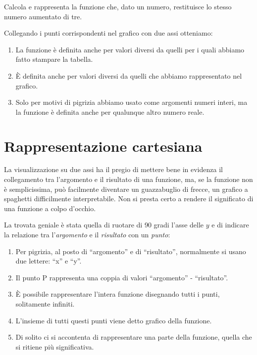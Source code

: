 \begin{esempio}
Calcola e rappresenta la funzione che, dato un numero, restituisce lo 
stesso numero aumentato di tre.


Collegando i punti corrispondenti nel grafico con due assi otteniamo:

\end{esempio}


\begin{osservazione}
\begin{enumerate}
\item La funzione è definita anche per valori diversi da quelli per i quali 
abbiamo fatto stampare la tabella.
\item È definita anche per valori diversi da quelli che abbiamo 
rappresentato nel grafico.
\item Solo per motivi di pigrizia abbiamo usato come argomenti numeri 
interi, ma la funzione è definita anche per qualunque altro numero reale.
\end{enumerate}
\end{osservazione}

\section{Rappresentazione cartesiana}
\label{sec:funzioni2_rcartesiana}

La visualizzazione su due assi ha il pregio di mettere bene in evidenza il 
collegamento tra l'argomento e il risultato di una funzione, ma, se la 
funzione non è semplicissima, può facilmente diventare un guazzabuglio di 
frecce, un grafico a spaghetti difficilmente interpretabile. Non si presta 
certo a rendere il significato di una funzione a colpo d'occhio.

La trovata geniale è stata quella di ruotare di 90 gradi l'asse delle $y$ e 
di indicare la relazione tra l'\emph{argomento} e il \emph{risultato} con 
un \emph{punto}:


\begin{osservazione}
\begin{enumerate} [nosep]
\item Per pigrizia, al posto di  ``argomento'' e di  ``risultato'', 
normalmente si usano due lettere:  ``x'' e  ``y''.
\item Il punto P rappresenta una coppia di valori  ``argomento'' -  
``risultato''.
\item È possibile rappresentare l'intera funzione disegnando tutti i punti, 
solitamente infiniti.
\item L'insieme di tutti questi punti viene detto grafico della funzione.
\item Di solito ci si accontenta di rappresentare una parte della funzione, 
quella che si ritiene più significativa.
\end{enumerate}
\end{osservazione}

